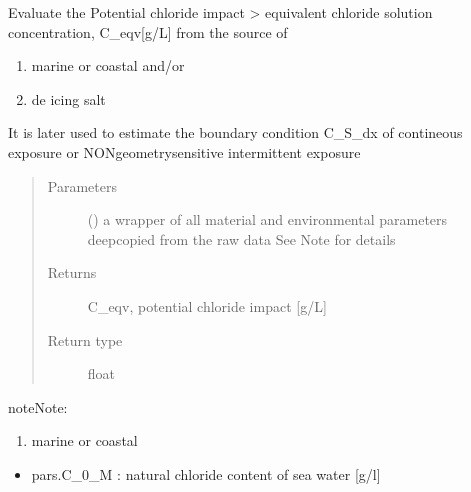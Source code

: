 \documentclass[letterpaper,10pt,english]{sphinxmanual}
\begin{document}
\begin{fulllineitems}
\label{\detokenize{chloride:chloride.C_eqv}}
\sphinxAtStartPar
Evaluate the Potential chloride impact \sphinxhyphen{}\textgreater{} equivalent chloride solution concentration, C\_eqv{[}g/L{]}
from the source of
\begin{enumerate}
%
\item {} 
\sphinxAtStartPar
marine or coastal and/or

\item {} 
\sphinxAtStartPar
de icing salt

\end{enumerate}

\sphinxAtStartPar
It is later used to estimate the boundary condition C\_S\_dx of contineous exposure or NON\sphinxhyphen{}geometry\sphinxhyphen{}sensitive intermittent exposure
\begin{quote}\begin{description}
\item[{Parameters}] \leavevmode
\sphinxAtStartPar
{} () \textendash{} a wrapper of all material and environmental parameters deep\sphinxhyphen{}copied from the raw data
See Note for details

\item[{Returns}] \leavevmode
\sphinxAtStartPar
C\_eqv, potential chloride impact {[}g/L{]}

\item[{Return type}] \leavevmode
\sphinxAtStartPar
float

\end{description}\end{quote}

\begin{sphinxadmonition}{note}{Note:}\begin{enumerate}
%
\item {} 
\sphinxAtStartPar
marine or coastal

\end{enumerate}
\begin{itemize}
\item {} 
\sphinxAtStartPar
pars.C\_0\_M : natural chloride content of sea water {[}g/l{]}


\end{itemize}
\end{sphinxadmonition}
\end{fulllineitems}
\end{document}
